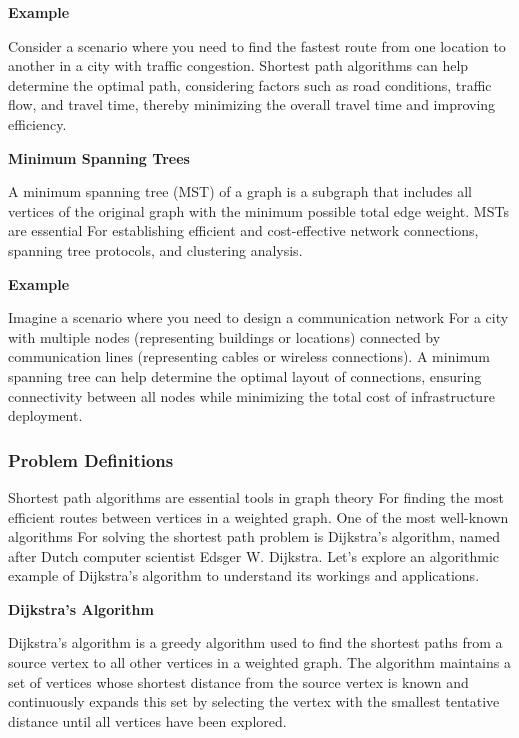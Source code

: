 \documentclass[12pt]{book} %
\begin{document}
\textbf{Example}

Consider a scenario where you need to find the fastest route from one location to another in a city with traffic congestion. Shortest path algorithms can help determine the optimal path, considering factors such as road conditions, traffic flow, and travel time, thereby minimizing the overall travel time and improving efficiency.

\textbf{Minimum Spanning Trees}

A minimum spanning tree (MST) of a graph is a subgraph that includes all vertices of the original graph with the minimum possible total edge weight. MSTs are essential For establishing efficient and cost-effective network connections, spanning tree protocols, and clustering analysis.

\textbf{Example}

Imagine a scenario where you need to design a communication network For a city with multiple nodes (representing buildings or locations) connected by communication lines (representing cables or wireless connections). A minimum spanning tree can help determine the optimal layout of connections, ensuring connectivity between all nodes while minimizing the total cost of infrastructure deployment.


\subsubsection{Problem Definitions}

Shortest path algorithms are essential tools in graph theory For finding the most efficient routes between vertices in a weighted graph. One of the most well-known algorithms For solving the shortest path problem is Dijkstra's algorithm, named after Dutch computer scientist Edsger W. Dijkstra. Let's explore an algorithmic example of Dijkstra's algorithm to understand its workings and applications.

\textbf{Dijkstra's Algorithm}

Dijkstra's algorithm is a greedy algorithm used to find the shortest paths from a source vertex to all other vertices in a weighted graph. The algorithm maintains a set of vertices whose shortest distance from the source vertex is known and continuously expands this set by selecting the vertex with the smallest tentative distance until all vertices have been explored.
\end{document}
